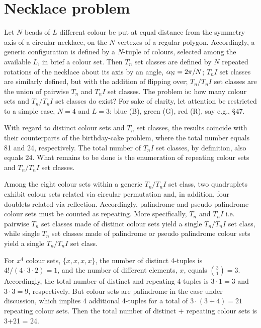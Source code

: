 \documentclass[12pt,a4paper]{article}
\begin{document}
\section{Necklace problem}
\label{a:nela}

Let $N$ beads of $L$ different colour be put at equal distance from the
symmetry axis of a circular necklace, on the $N$ vertexes of a regular
polygon.
Accordingly, a generic configuration is defined by a $N$-tuple of colours,
selected among the available $L$, in brief a colour set.   Then $T_n$ set
classes are defined by $N$ repeated rotations of the necklace about its axis
by an angle, $\alpha_{\rm N}=2\pi/N$; $T_nI$ set classes are similarly
defined, but with the addition of flipping over; $T_n/T_nI$ set classes are
the union of pairwise $T_n$ and $T_nI$ set classes.   
The problem is: how many colour sets and
$T_n/T_nI$ set classes do exist?   For sake of clarity, let attention
be restricted to a simple case, $N=4$ and $L=3$: blue (B), green (G), red (R),
say e.g., \cite{Hoo07} \S47.

With regard to distinct colour sets and $T_n$ set classes, the results
coincide with their counterparts of the birthday-cake problem, where the
total number equals 81 and 24, respectively.   The total number of $T_nI$ set
classes, by definition, also equals 24.   What remains to be done is the
enumeration of repeating colour sets and $T_n/T_nI$ set classes.

Among the eight colour sets within a generic $T_n/T_nI$ set class, two
quadruplets exhibit colour sets related via circular permutation and, in
addition, four doublets related via reflection.   Accordingly, palindrome and
pseudo palindrome colour sets must be counted as repeating.    More
specifically,
$T_n$ and $T_nI$ i.e. pairwise $T_n$ set classes made of distinct colour sets
yield a single $T_n/T_nI$ set class, while single $T_n$ set classes made of
palindrome or pseudo palindrome colour sets yield a single $T_n/T_nI$ set
class.

For $x^4$ colour sets, $\{x,x,x,x\}$, the number of distinct 4-tuples is 
$4!/(4\cdot3\cdot2)=1$, and the number of different elements, $x$, equals
${3\choose1}=3$.   Accordingly, the total number of distinct and repeating
4-tuples is $3\cdot1=3$ and $3\cdot3=9$, respectively.   But colour sets are
palindrome in the case under discussion, which implies 4 additional 4-tuples
for a total of $3\cdot(3+4) = 21$ repeating colour sets. Then the total number
of distinct + repeating colour sets is 3+21 = 24.
\end{document}
